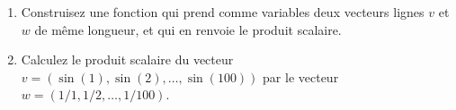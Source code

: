 \begin{exercice}\label{exoMatlab0034}

\begin{enumerate}
\item Construisez une fonction qui prend comme variables deux vecteurs lignes $v$ et $w$ de même longueur, et qui en renvoie le produit scalaire.
\item Calculez le produit scalaire du vecteur $v=(\sin(1), \sin(2), \dots, \sin(100))$ par le vecteur $w=(1/1, 1/2, \dots, 1/100)$.
\end{enumerate}

\end{exercice}
